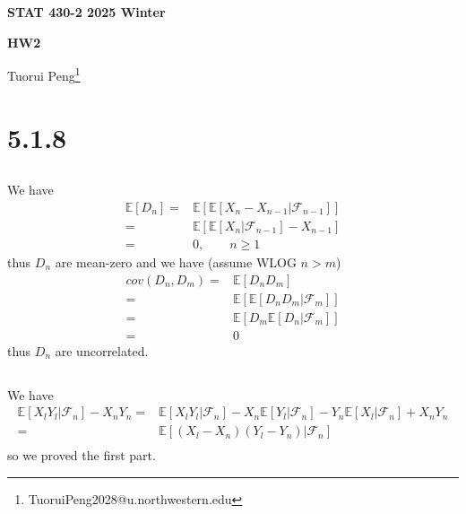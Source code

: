 \documentclass[11pt,a4paper]{ctexart}
\numberwithin{equation}{section}%
\newcommand{\F}{\mathcal{F}}
\begin{document}
\begin{center}\thispagestyle{plain}

{\LARGE\textbf{STAT 430-2 2025 Winter}}

{\Large\textbf{HW2}}

Tuorui Peng\footnote{TuoruiPeng2028@u.northwestern.edu}
\end{center}

\thispagestyle{myheadings}
\pagestyle{myheadings}



\section{5.1.8}

\subsection{}
We have
\begin{align*}
    \mathbb{E}\left[ D_n \right] =& \mathbb{E}\left[ \mathbb{E}\left[ X_n-X_{n-1} | \F_{n-1} \right]  \right]  \\
    =& \mathbb{E}\left[ \mathbb{E}\left[ X_n|\F_{n-1} \right] - X_{n-1} \right] \\
    =&0,\qquad n\geq 1
\end{align*}
thus $ D_n $ are mean-zero and we have (assume WLOG $ n>m $)
\begin{align*}
    cov(D_n,D_m) =& \mathbb{E}\left[ D_nD_m \right] \\
    =&\mathbb{E}\left[ \mathbb{E}\left[ D_nD_m|\F_m \right]  \right] \\
    =&\mathbb{E}\left[ D_m\mathbb{E}\left[ D_n|\F_m \right]  \right] \\
    =&0
\end{align*}
thus $ D_n $ are uncorrelated.


\subsection{}

We have
\begin{align*}
    \mathbb{E}\left[ X_lY_l|\F_n \right] - X_nY_n  =& \mathbb{E}\left[ X_lY_l | \F_n \right] - X_n\mathbb{E}\left[ Y_l|\F_n \right] - Y_n\mathbb{E}\left[ X_l|\F_n \right] + X_nY_n \\ 
    =&  \mathbb{E}\left[ (X_l-X_n)(Y_l-Y_n)|\F_n \right] \\
\end{align*}
so we proved the first part. 
\end{document}

